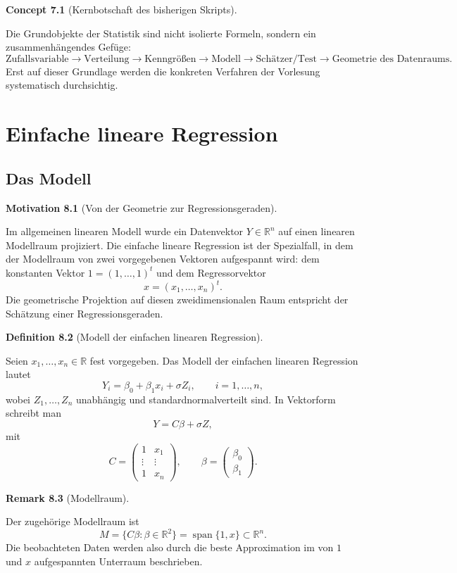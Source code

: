 \documentclass[10pt, letterpaper]{article}
\newcommand{\R}{\mathbb{R}}
\newcommand{\CustomHeading}[3]{%
  \par\medskip\noindent%
  \textbf{#1 #2} \textnormal{(#3)}.\enskip%
}
\newenvironment{DEF}[2]{\CustomHeading{Definition}{#1}{#2}}{}
\newenvironment{REM}[2]{\CustomHeading{Remark}{#1}{#2}}{}
\newenvironment{CONC}[2]{\CustomHeading{Concept}{#1}{#2}}{}
\newenvironment{MOT}[2]{\CustomHeading{Motivation}{#1}{#2}}{}
\begin{document}
\begin{CONC}{7.1}{Kernbotschaft des bisherigen Skripts}
Die Grundobjekte der Statistik sind nicht isolierte Formeln, sondern ein zusammenhängendes Gefüge:
\[
\text{Zufallsvariable}
\longrightarrow
\text{Verteilung}
\longrightarrow
\text{Kenngrößen}
\longrightarrow
\text{Modell}
\longrightarrow
\text{Schätzer/Test}
\longrightarrow
\text{Geometrie des Datenraums}.
\]
Erst auf dieser Grundlage werden die konkreten Verfahren der Vorlesung systematisch durchsichtig.
\end{CONC}


\section{Einfache lineare Regression}

\subsection{Das Modell}

\begin{MOT}{8.1}{Von der Geometrie zur Regressionsgeraden}
Im allgemeinen linearen Modell wurde ein Datenvektor \(Y\in \R^n\) auf einen linearen Modellraum projiziert. Die einfache lineare Regression ist der Spezialfall, in dem der Modellraum von zwei vorgegebenen Vektoren aufgespannt wird: dem konstanten Vektor \(1=(1,\dots,1)^t\) und dem Regressorvektor
\[
x=(x_1,\dots,x_n)^t.
\]
Die geometrische Projektion auf diesen zweidimensionalen Raum entspricht der Schätzung einer Regressionsgeraden.
\end{MOT}

\begin{DEF}{8.2}{Modell der einfachen linearen Regression}
Seien \(x_1,\dots,x_n\in \R\) fest vorgegeben. Das Modell der einfachen linearen Regression lautet
\[
Y_i=\beta_0+\beta_1 x_i+\sigma Z_i,\qquad i=1,\dots,n,
\]
wobei \(Z_1,\dots,Z_n\) unabhängig und standardnormalverteilt sind.
In Vektorform schreibt man
\[
Y=C\beta+\sigma Z,
\]
mit
\[
C=
\begin{pmatrix}
1 & x_1\\
\vdots & \vdots\\
1 & x_n
\end{pmatrix},
\qquad
\beta=
\begin{pmatrix}
\beta_0\\
\beta_1
\end{pmatrix}.
\]
\end{DEF}

\begin{REM}{8.3}{Modellraum}
Der zugehörige Modellraum ist
\[
M=\{C\beta:\beta\in \R^2\}=\operatorname{span}\{1,x\}\subset \R^n.
\]
Die beobachteten Daten werden also durch die beste Approximation im von \(1\) und \(x\) aufgespannten Unterraum beschrieben.
\end{REM}
\end{document}
